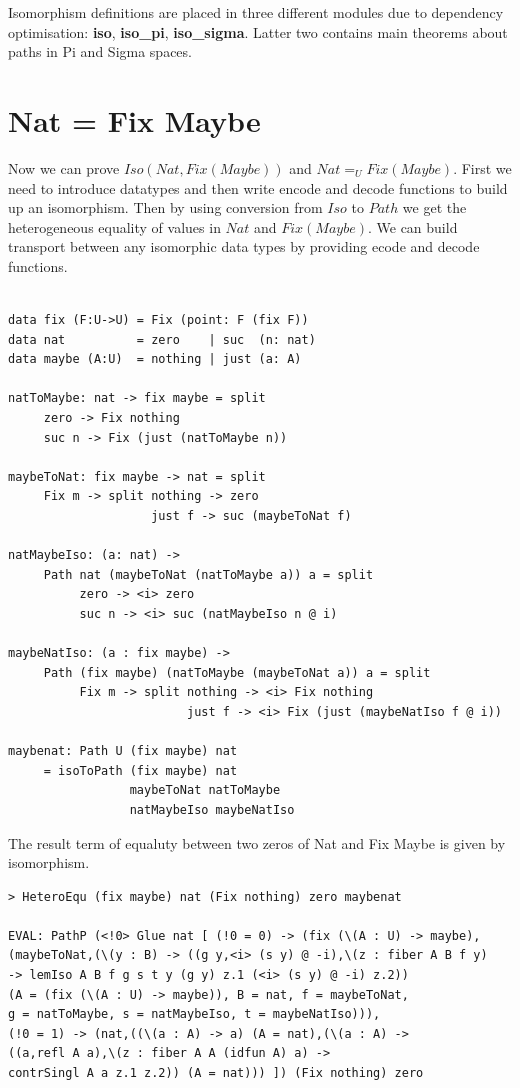 \documentclass{svproc}
\begin{document}
Isomorphism definitions are placed in three different modules due to dependency
optimisation: {\bf iso}, {\bf iso\_pi}, {\bf iso\_sigma}. Latter two contains
main theorems about paths in Pi and Sigma spaces.

\newpage
\section{Nat = Fix Maybe}

Now we can prove $Iso(Nat,Fix(Maybe))$ and $Nat =_U Fix(Maybe)$. First we need to introduce
datatypes and then write encode and decode functions to build up an isomorphism.
Then by using conversion from $Iso$ to $Path$ we get the heterogeneous equality
of values in $Nat$ and $Fix(Maybe)$. We can build transport between any isomorphic data types
by providing ecode and decode functions.

\begin{lstlisting}[mathescape=true]

data fix (F:U->U) = Fix (point: F (fix F))
data nat          = zero    | suc  (n: nat)
data maybe (A:U)  = nothing | just (a: A)

natToMaybe: nat -> fix maybe = split
     zero -> Fix nothing
     suc n -> Fix (just (natToMaybe n))

maybeToNat: fix maybe -> nat = split
     Fix m -> split nothing -> zero
                    just f -> suc (maybeToNat f)

natMaybeIso: (a: nat) ->
     Path nat (maybeToNat (natToMaybe a)) a = split
          zero -> <i> zero
          suc n -> <i> suc (natMaybeIso n @ i)

maybeNatIso: (a : fix maybe) ->
     Path (fix maybe) (natToMaybe (maybeToNat a)) a = split
          Fix m -> split nothing -> <i> Fix nothing
                         just f -> <i> Fix (just (maybeNatIso f @ i))

maybenat: Path U (fix maybe) nat
     = isoToPath (fix maybe) nat
                 maybeToNat natToMaybe
                 natMaybeIso maybeNatIso
\end{lstlisting}

\newpage
The result term of equaluty between two zeros of Nat and Fix Maybe is given by isomorphism.

\begin{lstlisting}[mathescape=true]
> HeteroEqu (fix maybe) nat (Fix nothing) zero maybenat

EVAL: PathP (<!0> Glue nat [ (!0 = 0) -> (fix (\(A : U) -> maybe),
(maybeToNat,(\(y : B) -> ((g y,<i> (s y) @ -i),\(z : fiber A B f y)
-> lemIso A B f g s t y (g y) z.1 (<i> (s y) @ -i) z.2))
(A = (fix (\(A : U) -> maybe)), B = nat, f = maybeToNat,
g = natToMaybe, s = natMaybeIso, t = maybeNatIso))),
(!0 = 1) -> (nat,((\(a : A) -> a) (A = nat),(\(a : A) ->
((a,refl A a),\(z : fiber A A (idfun A) a) ->
contrSingl A a z.1 z.2)) (A = nat))) ]) (Fix nothing) zero
\end{lstlisting}
\end{document}
